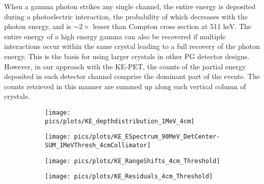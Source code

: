 \documentclass[11pt,a4paper]{article}
\begin{document}
When a gamma photon strikes any single channel, the entire energy is deposited during a photoelectric interaction, the probability of which decreases with the photon energy, and is $\sim 2\times$ lesser than Compton cross section at 511 keV.  The entire energy of a high energy gamma can also be recovered if multiple interactions occur within the same crystal leading to a full  recovery of the photon energy. This is the basis for using larger crystals in other PG detector designs. However, in our approach with the KE-PET, the counts of the partial energy deposited in each detector channel comprise the dominant part of the events. The counts retrieved in this manner are summed up along each vertical column of crystals. 




\begin{figure}[h] 
\centering
	\begin{subfigure}[b]{0.48\textwidth} %
	\centering
	\texttt{[image: pics/plots/KE\_depthdistribution\_1MeV\_4cm]}
	\caption{}
	\end{subfigure}
	\hfill
    \hspace{0.00\textwidth} %
	\begin{subfigure}[b]{0.46\textwidth} %
	\centering
	\texttt{[image: pics/plots/KE\_ESpectrum\_90MeV\_DetCenter-SUM\_1MeVThresh\_4cmCollimator]}
	\caption{}
	\end{subfigure}
	\hfill
	\begin{subfigure}[b]{0.49\textwidth} %
	\centering
	\texttt{[image: pics/plots/KE\_RangeShifts\_4cm\_Threshold]}
	\caption{}
	\end{subfigure}\label{fig_3D_sector}
	\hfill
    \hspace{0.00\textwidth} %
	\begin{subfigure}[b]{0.49\textwidth} %
	\centering
	\texttt{[image: pics/plots/KE\_Residuals\_4cm\_Threshold]}
	\caption{}
	\end{subfigure}\label{fig_3D_sector}
	\hfill

\end{figure}
\end{document}
